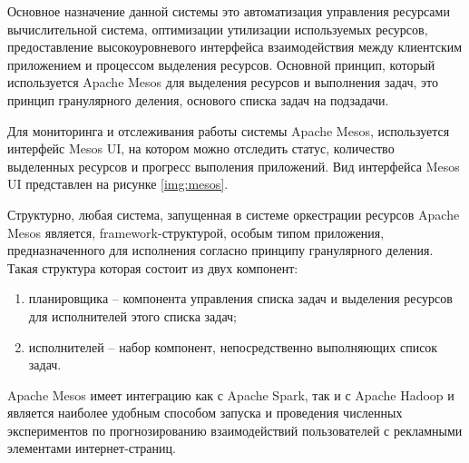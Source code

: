 Основное назначение данной системы это автоматизация управления ресурсами вычислительной система, оптимизации
утилизации используемых ресурсов, предоставление высокоуровневого интерфейса взаимодействия между клиентским
приложением и процессом выделения ресурсов. Основной принцип, который используется Apache Mesos для выделения ресурсов и выполнения задач, это принцип
гранулярного деления, основого списка задач на подзадачи.

Для мониторинга и отслеживания работы системы Apache Mesos, используется интерфейс Mesos UI,
на котором можно отследить статус, количество выделенных ресурсов и прогресс выполения приложений.
Вид интерфейса Mesos UI представлен на рисунке \ref{img:mesos}.


Структурно, любая система, запущенная в системе оркестрации ресурсов Apache Mesos является, 
framework-структурой, особым типом приложения, предназначенного для исполнения
согласно принципу гранулярного деления. Такая структура которая состоит из двух компонент:
\begin{enumerate}
    \item планировщика -- компонента управления списка задач и выделения ресурсов для исполнителей этого списка задач;
    \item исполнителей -- набор компонент, непосредственно выполняющих список задач.
\end{enumerate}  

Apache Mesos имеет интеграцию как с Apache Spark, так и с Apache Hadoop и является наиболее удобным
способом запуска и проведения численных экспериментов по прогнозированию взаимодействий пользователей
с рекламными элементами интернет-страниц.